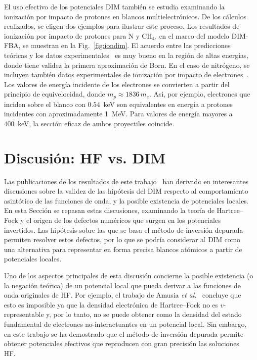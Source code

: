 El uso efectivo de los potenciales DIM también se estudia examinando 
la ionización por impacto de protones en blancos multielectrónicos. De 
los cálculos realizados, se eligen dos ejemplos para ilustrar este 
proceso. Los resultados de ionización por impacto de protones para N y 
CH$_4$, en el marco del modelo DIM-FBA, se muestran en la 
Fig.~\ref{fig:iondim}. El acuerdo entre las predicciones teóricas y los 
datos experimentales~\cite{Rudd:83,Rudd:85} es muy bueno en la región de 
altas energías, donde tiene validez la primera aproximación de Born. En 
el caso de nitrógeno, se incluyen también datos experimentales de 
ionización por impacto de electrones~\cite{Brook:78}. Los valores de 
energía incidente de los electrones se convierten a partir del principio 
de equivelocidad, donde $m_p\approx 1836\,m_e$. Así, por ejemplo, 
electrones que inciden sobre el blanco con $0.54$~keV son equivalentes 
en energía a protones incidentes con aproximadamente 1~MeV. Para valores 
de energía mayores a 400~keV, la sección eficaz de ambos proyectiles 
coincide. 

\section{Discusión: HF vs. DIM}
\label{sec:discusionHF}

Las publicaciones de los resultados de este trabajo~\cite{Mendez:16,
Mendez:19dim,Mendez:18,Mitnik:19} han derivado en interesantes 
discusiones sobre la validez de las hipótesis del DIM respecto al 
comportamiento asintótico de las funciones de onda, y la posible 
existencia de potenciales locales. En esta Sección se repasan estas 
discusiones, examinando la teoría de Hartree--Fock y el origen de los 
defectos numéricos que surgen en los potenciales invertidos. Las 
hipótesis sobre las que se basa el método de inversión depurada permiten 
resolver estos defectos, por lo que se podría considerar al DIM como una 
alternativa para representar en forma precisa blancos atómicos a partir 
de potenciales locales.

Uno de los aspectos principales de esta discusión concierne la posible 
existencia (o la negación teórica) de un potencial local que pueda 
derivar a las funciones de onda originales de HF. Por ejemplo, el 
trabajo de Amusia \textit{et al.}~\cite{Amusia:04} concluye que esto es 
imposible ya que la densidad electrónica de Hartree--Fock no es 
$v$-representable y, por lo tanto, no se puede obtener como la densidad 
del estado fundamental de electrones no-interactuantes en un potencial 
local. Sin embargo, en este trabajo se ha demostrado que el método de 
inversión depurada permite obtener potenciales efectivos que reproducen 
con gran precisión las soluciones HF.

